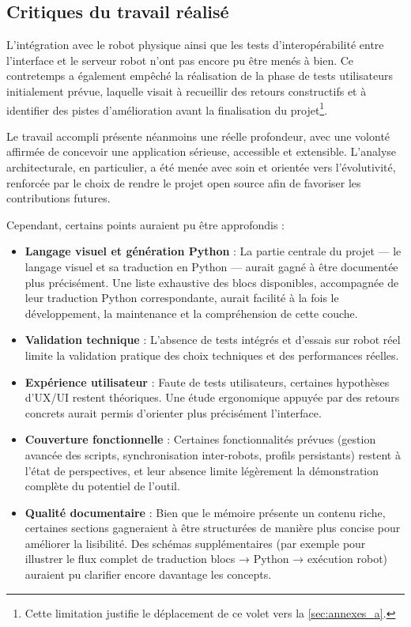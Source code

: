 \subsection{Critiques du travail réalisé} \label{sec:critiques}

L’intégration avec le robot physique ainsi que les tests d’interopérabilité entre l’interface et le serveur robot n’ont pas encore pu être menés à bien.
Ce contretemps a également empêché la réalisation de la phase de tests utilisateurs initialement prévue, laquelle visait à recueillir des retours constructifs et à identifier des pistes d’amélioration avant la finalisation du projet\footnote{Cette limitation justifie le déplacement de ce volet vers la \autoref{sec:annexes_a}.}.

Le travail accompli présente néanmoins une réelle profondeur, avec une volonté affirmée de concevoir une application sérieuse, accessible et extensible.  
L’analyse architecturale, en particulier, a été menée avec soin et orientée vers l’évolutivité, renforcée par le choix de rendre le projet open source afin de favoriser les contributions futures.

Cependant, certains points auraient pu être approfondis :
\begin{itemize}
    \item \textbf{Langage visuel et génération Python} :  
    La partie centrale du projet — le langage visuel et sa traduction en Python — aurait gagné à être documentée plus précisément.  
    Une liste exhaustive des blocs disponibles, accompagnée de leur traduction Python correspondante, aurait facilité à la fois le développement, la maintenance et la compréhension de cette couche.
    
    \item \textbf{Validation technique} :  
    L’absence de tests intégrés et d’essais sur robot réel limite la validation pratique des choix techniques et des performances réelles.
    
    \item \textbf{Expérience utilisateur} :  
    Faute de tests utilisateurs, certaines hypothèses d’UX/UI restent théoriques. Une étude ergonomique appuyée par des retours concrets aurait permis d’orienter plus précisément l’interface.
    
    \item \textbf{Couverture fonctionnelle} :  
    Certaines fonctionnalités prévues (gestion avancée des scripts, synchronisation inter-robots, profils persistants) restent à l’état de perspectives, et leur absence limite légèrement la démonstration complète du potentiel de l’outil.
    
    \item \textbf{Qualité documentaire} :  
    Bien que le mémoire présente un contenu riche, certaines sections gagneraient à être structurées de manière plus concise pour améliorer la lisibilité.  
    Des schémas supplémentaires (par exemple pour illustrer le flux complet de traduction blocs → Python → exécution robot) auraient pu clarifier encore davantage les concepts.
\end{itemize}

